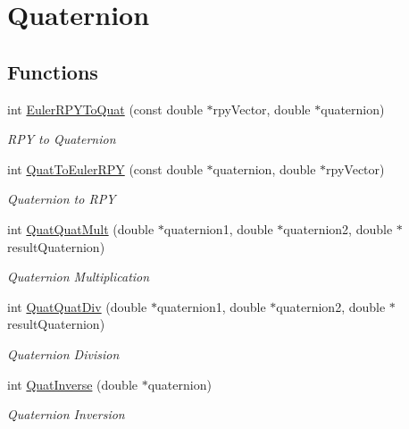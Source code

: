 \hypertarget{group__quaternion}{
\section{Quaternion}
\label{group__quaternion}
}
\subsection*{Functions}
\begin{CompactItemize}
\item 
int \hyperlink{group__quaternion_g7b1db600de72218b50d586962dcb3b34}{EulerRPYToQuat} (const double $\ast$rpyVector, double $\ast$quaternion)
\begin{CompactList}\small\item\em RPY to Quaternion \item\end{CompactList}\item 
int \hyperlink{group__quaternion_g77ac8a89edcac95acc7b2d72c199887e}{QuatToEulerRPY} (const double $\ast$quaternion, double $\ast$rpyVector)
\begin{CompactList}\small\item\em Quaternion to RPY \item\end{CompactList}\item 
int \hyperlink{group__quaternion_g72107735baae1beaa708201db02c785d}{QuatQuatMult} (double $\ast$quaternion1, double $\ast$quaternion2, double $\ast$resultQuaternion)
\begin{CompactList}\small\item\em Quaternion Multiplication \item\end{CompactList}\item 
int \hyperlink{group__quaternion_g46246ce9c280deac81df5a5c1726e0d3}{QuatQuatDiv} (double $\ast$quaternion1, double $\ast$quaternion2, double $\ast$resultQuaternion)
\begin{CompactList}\small\item\em Quaternion Division \item\end{CompactList}\item 
int \hyperlink{group__quaternion_g2f9bc45e4b1c6431b33c4ae852603254}{QuatInverse} (double $\ast$quaternion)
\begin{CompactList}\small\item\em Quaternion Inversion \item\end{CompactList}\item 

\end{CompactItemize}
